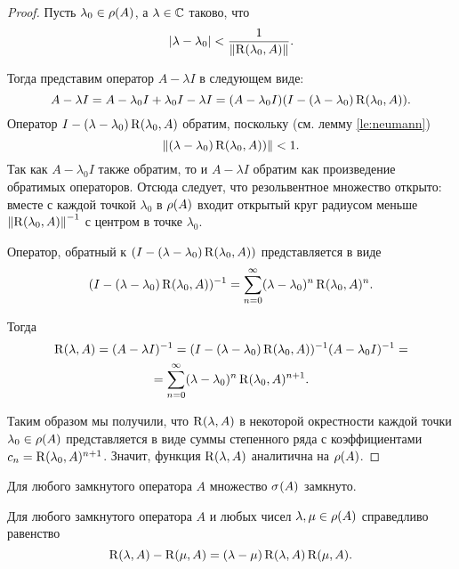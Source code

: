 \begin{proof}
    Пусть $\lambda_0 \in \operatorname{\rho}(A)$, а $\lambda \in \mathbb{C}$ таково, что
    \[ \left|\lambda - \lambda_0\right| < \frac{1}{\left\|\operatorname{R}(\lambda_0, A)\right\|}. \]

    Тогда представим оператор $A - \lambda I$ в следующем виде:
    \[ A - \lambda I = A - \lambda_0 I + \lambda_0 I - \lambda I = 
       (A - \lambda_0 I)(I - (\lambda - \lambda_0) \operatorname{R}(\lambda_0, A)). \]
    Оператор $I - (\lambda - \lambda_0) \operatorname{R}(\lambda_0, A)$ обратим, поскольку 
    (см. лемму \ref{le:neumann})
    \[ \left\|(\lambda - \lambda_0) \operatorname{R}(\lambda_0, A))\right\| < 1. \]
    Так как $A - \lambda_0 I$ также обратим, то и $A - \lambda I$ обратим как произведение
    обратимых операторов. Отсюда следует, что резольвентное множество открыто: вместе с каждой
    точкой $\lambda_0$
    в $\operatorname{\rho}(A)$ входит открытый круг радиусом меньше $\left\|\operatorname{R}(\lambda_0, A)\right\|^{-1}$ с 
    центром в точке $\lambda_0$.

    Оператор, обратный к $(I - (\lambda - \lambda_0) \operatorname{R}(\lambda_0, A))$ представляется
    в виде
    \[ (I - (\lambda - \lambda_0) \operatorname{R}(\lambda_0, A))^{-1} = 
        \sum_{n=0}^\infty (\lambda - \lambda_0)^n \operatorname{R}(\lambda_0, A)^n. \]

    Тогда 
    \begin{multline*}
        \operatorname{R}(\lambda, A) = 
            (A - \lambda I)^{-1} = (I - (\lambda - \lambda_0) \operatorname{R}(\lambda_0, A))^{-1}
             (A - \lambda_0 I)^{-1} =\\= \sum_{n=0}^\infty (\lambda - \lambda_0)^n 
             \operatorname{R}(\lambda_0, A)^{n+1}.
    \end{multline*}

    Таким образом мы получили, что $\operatorname{R}(\lambda, A)$ в некоторой окрестности каждой точки
    $\lambda_0 \in \operatorname{\rho}(A)$
    представляется в виде суммы степенного ряда с коэффициентами 
    $c_n = \operatorname{R}(\lambda_0, A)^{n+1}$. Значит,
    функция $\operatorname{R}(\lambda, A)$ аналитична на $\operatorname{\rho}(A)$.
\end{proof}

\begin{corollary}
    Для любого замкнутого оператора $A$ множество $\spectrum{A}$ замкнуто.
\end{corollary}

\begin{theorem}
    Для любого замкнутого оператора $A$ и любых чисел $\lambda, \mu \in \operatorname{\rho}(A)$ 
    справедливо равенство
    \[ \operatorname{R}(\lambda, A) - \operatorname{R}(\mu, A) 
        = (\lambda - \mu) \operatorname{R}(\lambda, A)\operatorname{R}(\mu, A). \]
\end{theorem}

